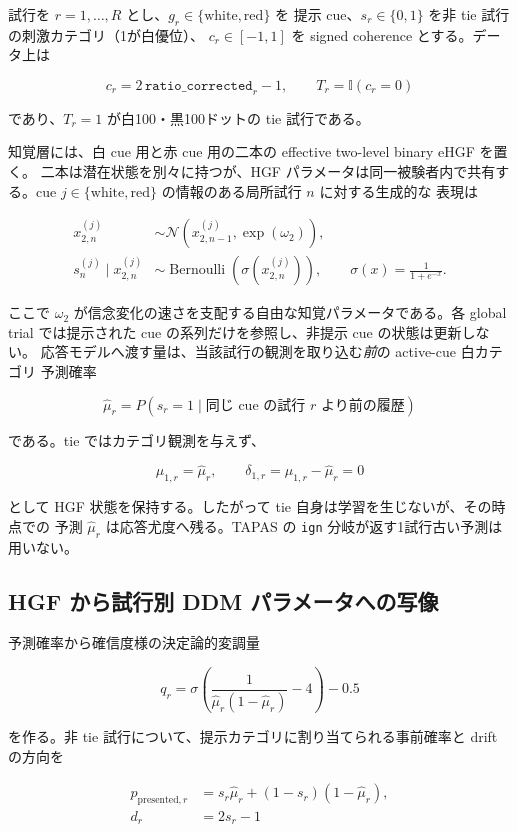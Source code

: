 \documentclass[11pt]{ltjsarticle}
\newcommand{\code}[1]{\texttt{#1}}
\begin{document}
試行を \(r=1,\ldots,R\) とし、\(g_r\in\{\mathrm{white},\mathrm{red}\}\) を
提示 cue、\(s_r\in\{0,1\}\) を非 tie 試行の刺激カテゴリ（1が白優位）、
\(c_r\in[-1,1]\) を signed coherence とする。データ上は

\[
c_r=2\,\mathtt{ratio\_corrected}_r-1,
\qquad
T_r=\mathbb{I}(c_r=0)
\]

であり、\(T_r=1\) が白100・黒100ドットの tie 試行である。

知覚層には、白 cue 用と赤 cue 用の二本の effective two-level binary eHGF を置く。
二本は潜在状態を別々に持つが、HGF パラメータは同一被験者内で共有する。cue
\(j\in\{\mathrm{white},\mathrm{red}\}\) の情報のある局所試行 \(n\) に対する生成的な
表現は

\begin{align}
x^{(j)}_{2,n}
  &\sim \mathcal{N}\!\left(x^{(j)}_{2,n-1},\exp(\omega_2)\right),\\
s^{(j)}_n\mid x^{(j)}_{2,n}
  &\sim \operatorname{Bernoulli}\!\left(\sigma(x^{(j)}_{2,n})\right),
\qquad
\sigma(x)=\frac{1}{1+e^{-x}} .
\end{align}

ここで \(\omega_2\) が信念変化の速さを支配する自由な知覚パラメータである。各
global trial では提示された cue の系列だけを参照し、非提示 cue の状態は更新しない。
応答モデルへ渡す量は、当該試行の観測を取り込む\emph{前}の active-cue 白カテゴリ
予測確率

\[
\hat\mu_r
  =P(s_r=1\mid \text{同じ cue の試行 }r\text{ より前の履歴})
\]

である。tie ではカテゴリ観測を与えず、

\[
\mu_{1,r}=\hat\mu_r,
\qquad
\delta_{1,r}=\mu_{1,r}-\hat\mu_r=0
\]

として HGF 状態を保持する。したがって tie 自身は学習を生じないが、その時点での
予測 \(\hat\mu_r\) は応答尤度へ残る。TAPAS の \code{ign} 分岐が返す1試行古い予測は
用いない。

\subsection{HGF から試行別 DDM パラメータへの写像}

予測確率から確信度様の決定論的変調量

\[
q_r=\sigma\!\left(\frac{1}{\hat\mu_r(1-\hat\mu_r)}-4\right)-0.5
\]

を作る。非 tie 試行について、提示カテゴリに割り当てられる事前確率と drift の方向を

\begin{align}
p_{\mathrm{presented},r}
  &=s_r\hat\mu_r+(1-s_r)(1-\hat\mu_r),\\
d_r&=2s_r-1
\end{align}
\end{document}
